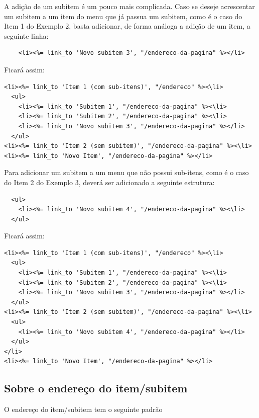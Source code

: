 A adição de um subitem é um pouco mais complicada. Caso se deseje acrescentar um subitem a um item do menu que já passua um subitem, como é o caso do Item 1 do Exemplo 2, basta adicionar, de forma análoga a adição de um item, a seguinte linha:

\begin{verbatim}
    <li><%= link_to 'Novo subitem 3', "/endereco-da-pagina" %></li>
\end{verbatim}

Ficará assim:

\begin{verbatim}
<li><%= link_to 'Item 1 (com sub-itens)', "/endereco" %><\li>
  <ul>
    <li><%= link_to 'Subitem 1', "/endereco-da-pagina" %><\li>
    <li><%= link_to 'Subitem 2', "/endereco-da-pagina" %><\li>
    <li><%= link_to 'Novo subitem 3', "/endereco-da-pagina" %></li>
  </ul>
<li><%= link_to 'Item 2 (sem subitem)', "/endereco-da-pagina" %><\li>
<li><%= link_to 'Novo Item', "/endereco-da-pagina" %></li>
\end{verbatim}

Para adicionar um subitem a um menu que não possui sub-itens, como é o caso do Item 2 do Exemplo 3, deverá ser adicionado a seguinte estrutura:

\begin{verbatim}
  <ul>
    <li><%= link_to 'Novo subitem 4', "/endereco-da-pagina" %><\li>
  </ul>
\end{verbatim}

Ficará assim:

\begin{verbatim}
<li><%= link_to 'Item 1 (com sub-itens)', "/endereco" %><\li>
  <ul>
    <li><%= link_to 'Subitem 1', "/endereco-da-pagina" %><\li>
    <li><%= link_to 'Subitem 2', "/endereco-da-pagina" %><\li>
    <li><%= link_to 'Novo subitem 3', "/endereco-da-pagina" %></li>
  </ul>
<li><%= link_to 'Item 2 (sem subitem)', "/endereco-da-pagina" %><\li>
  <ul>
    <li><%= link_to 'Novo subitem 4', "/endereco-da-pagina" %></li>
  </ul>
</li>
<li><%= link_to 'Novo Item', "/endereco-da-pagina" %></li>
\end{verbatim}

\subsection{Sobre o endereço do item/subitem}

O endereço do item/subitem tem o seguinte padrão

